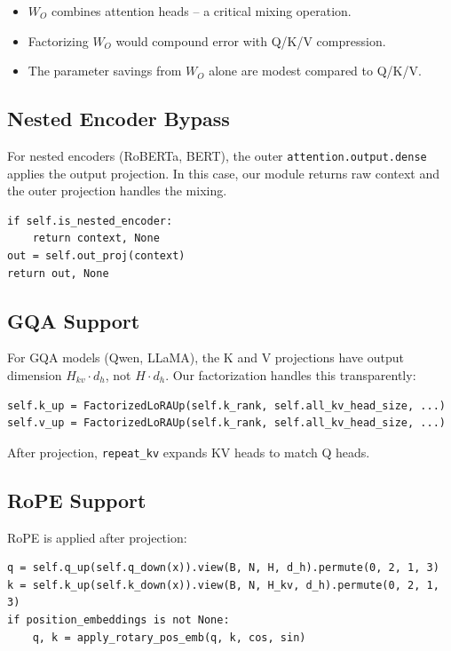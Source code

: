 \begin{itemize}
\item $W_O$ combines attention heads -- a critical mixing operation.
\item Factorizing $W_O$ would compound error with Q/K/V compression.
\item The parameter savings from $W_O$ alone are modest compared to Q/K/V.

\end{itemize}
\subsection{Nested Encoder Bypass}

For nested encoders (RoBERTa, BERT), the outer \texttt{attention.output.dense} 
applies the output projection. In this case, our module returns raw context 
and the outer projection handles the mixing.

\begin{lstlisting}
if self.is_nested_encoder:
    return context, None
out = self.out_proj(context)
return out, None
\end{lstlisting}

\subsection{GQA Support}

For GQA models (Qwen, LLaMA), the K and V projections have output dimension 
$H_{kv} \cdot d_h$, not $H \cdot d_h$. Our factorization handles this 
transparently:

\begin{lstlisting}
self.k_up = FactorizedLoRAUp(self.k_rank, self.all_kv_head_size, ...)
self.v_up = FactorizedLoRAUp(self.k_rank, self.all_kv_head_size, ...)
\end{lstlisting}

After projection, \texttt{repeat\_kv} expands KV heads to match Q heads.

\subsection{RoPE Support}

RoPE is applied after projection:

\begin{lstlisting}
q = self.q_up(self.q_down(x)).view(B, N, H, d_h).permute(0, 2, 1, 3)
k = self.k_up(self.k_down(x)).view(B, N, H_kv, d_h).permute(0, 2, 1, 3)
if position_embeddings is not None:
    q, k = apply_rotary_pos_emb(q, k, cos, sin)
\end{lstlisting}

